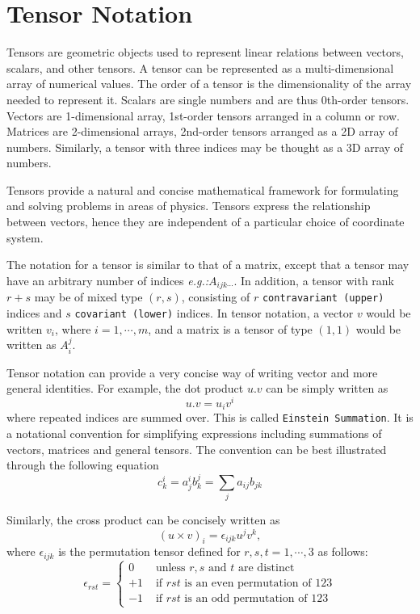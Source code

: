 \section*{Tensor Notation}
Tensors are geometric objects used to represent linear relations between vectors, scalars, and other tensors. A tensor can be represented as a multi-dimensional array of numerical values. The order of a tensor is the dimensionality of the array needed to represent it. Scalars are single numbers and are thus 0th-order tensors. Vectors are 1-dimensional array, 1st-order tensors arranged in a column or row. Matrices are 2-dimensional arrays, 2nd-order tensors arranged as a 2D array of numbers. Similarly, a tensor with three indices may be thought as a 3D array of numbers.

Tensors provide a natural and concise mathematical framework for formulating and solving problems in areas of physics. Tensors express the relationship between vectors, hence they are independent of a particular choice of coordinate system. 

The notation for a tensor is similar to that of a matrix, except that a tensor may have an arbitrary number of indices \textit{e.g.:}$A_{ijk\dotsb}$. In addition, a tensor with rank $r+s$ may be of mixed type $(r,s)$, consisting of $r$ \texttt{contravariant (upper)} indices and $s$ \texttt{covariant (lower)} indices. In tensor notation, a vector $v$ would be written $v_i$, where $i =1,\dotsb,m$, and a matrix is a tensor of type $(1,1)$ would be written as $A^{j}_{i}$.

Tensor notation can provide a very concise way of writing vector and more general identities. For example, the dot product $u.v$ can be simply written as 
$$
u.v = u_{i}v^{i}
$$
where repeated indices are summed over. This is called \texttt{Einstein Summation}. It is a notational convention for simplifying expressions including summations of vectors, matrices and general tensors. The convention can be best illustrated through the following equation
$$
  c^{i}_{k} = a^{i}_{j}b^{j}_{k} = \sum_{j} a_{ij}b_{jk}
$$

Similarly, the cross product can be concisely written as
$$
  (u\times v)_{i} = \epsilon_{ijk} u^{j} v^{k},
$$
where $\epsilon_{ijk}$ is the permutation tensor defined for $r,s,t =1,\dotsb,3$ as follows:
$$
\epsilon_{rst} = \begin{cases}
  0 & \text{ unless } r,s \text{ and } t \text{ are distinct}\\
  +1 & \text{ if } rst \text{ is an even permutation of } 123\\
  -1 & \text{ if } rst \text{ is an odd permutation of } 123
\end{cases}
$$
